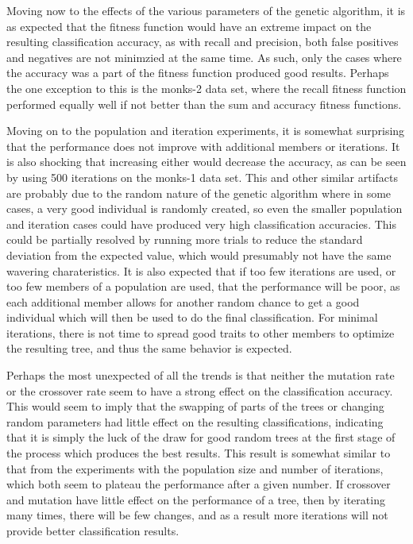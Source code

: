 \documentclass[12pt, letterpaper]{article}
\begin{document}
Moving now to the effects of the various parameters of the genetic algorithm,
it is as expected that the fitness function would have an extreme impact on
the resulting classification accuracy, as with recall and precision, both
false positives and negatives are not minimzied at the same time.  As such,
only the cases where the accuracy was a part of the fitness function produced
good results.  Perhaps the one exception to this is the monks-2 data set, where
the recall fitness function performed equally well if not better than the sum
and accuracy fitness functions.  

Moving on to the population and iteration experiments, it is somewhat surprising
that the performance does not improve with additional members or iterations.  
It is also shocking that increasing either would decrease the accuracy, as 
can be seen by using 500 iterations on the monks-1 data set.  This and other
similar artifacts are probably due to the random nature of the genetic algorithm
where in some cases, a very good individual is randomly created, so even
the smaller population and iteration cases could have produced very high
classification accuracies.  This could be partially resolved by running more
trials to reduce the standard deviation from the expected value, which would
presumably not have the same wavering charateristics.  It is also expected that
if too few iterations are used, or too few members of a population are used, 
that the performance will be poor, as each additional member allows for another
random chance to get a good individual which will then be used to do the final
classification.  For minimal iterations, there is not time to spread good
traits to other members to optimize the resulting tree, and thus the same 
behavior is expected. 

Perhaps the most unexpected of all the trends is that neither the mutation rate
or the crossover rate seem to have a strong effect on the classification
accuracy.  This would seem to imply that the swapping of parts of the trees or
changing random parameters had little effect on the resulting classifications, 
indicating that it is simply the luck of the draw for good random trees at the
first stage of the process which produces the best results.  This result is
somewhat similar to that from the experiments with the population size and
number of iterations, which both seem to plateau the performance after a 
given number.  If crossover and mutation have little effect on the performance
of a tree, then by iterating many times, there will be few changes, and as a
result more iterations will not provide better classification results.
\end{document}
